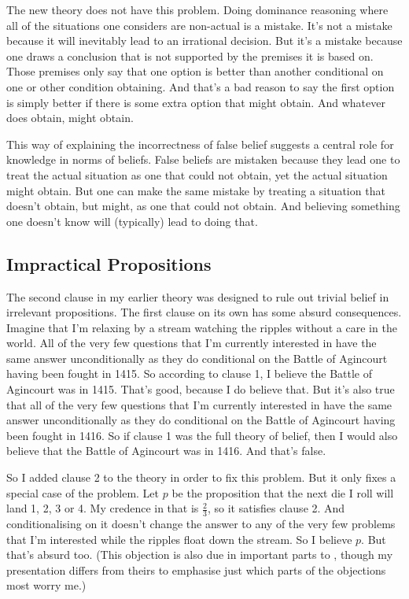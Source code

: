 \documentclass[11pt,]{book}
\begin{document}
The new theory does not have this problem. Doing dominance reasoning where all of the situations one considers are non-actual is a mistake. It's not a mistake because it will inevitably lead to an irrational decision. But it's a mistake because one draws a conclusion that is not supported by the premises it is based on. Those premises only say that one option is better than another conditional on one or other condition obtaining. And that's a bad reason to say the first option is simply better if there is some extra option that might obtain. And whatever does obtain, might obtain.

This way of explaining the incorrectness of false belief suggests a central role for knowledge in norms of beliefs. False beliefs are mistaken because they lead one to treat the actual situation as one that could not obtain, yet the actual situation might obtain. But one can make the same mistake by treating a situation that doesn't obtain, but might, as one that could not obtain. And believing something one doesn't know will (typically) lead to doing that.

\hypertarget{meimpractical}{%
\subsection{Impractical Propositions}\label{meimpractical}}

The second clause in my earlier theory was designed to rule out trivial belief in irrelevant propositions. The first clause on its own has some absurd consequences. Imagine that I'm relaxing by a stream watching the ripples without a care in the world. All of the very few questions that I'm currently interested in have the same answer unconditionally as they do conditional on the Battle of Agincourt having been fought in 1415. So according to clause 1, I believe the Battle of Agincourt was in 1415. That's good, because I do believe that. But it's also true that all of the very few questions that I'm currently interested in have the same answer unconditionally as they do conditional on the Battle of Agincourt having been fought in 1416. So if clause 1 was the full theory of belief, then I would also believe that the Battle of Agincourt was in 1416. And that's false.

So I added clause 2 to the theory in order to fix this problem. But it only fixes a special case of the problem. Let \(p\) be the proposition that the next die I roll will land 1, 2, 3 or 4. My credence in that is \(\frac{2}{3}\), so it satisfies clause 2. And conditionalising on it doesn't change the answer to any of the very few problems that I'm interested while the ripples float down the stream. So I believe \(p\). But that's absurd too. (This objection is also due in important parts to \citet{RossSchroeder2014}, though my presentation differs from theirs to emphasise just which parts of the objections most worry me.)
\end{document}
